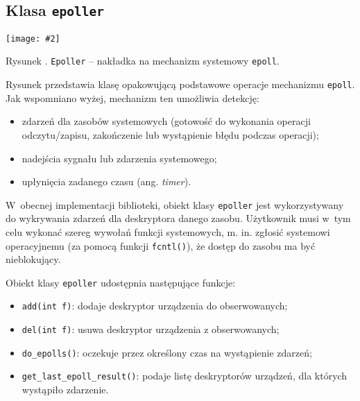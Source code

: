 \documentclass[12pt]{mwart}
\newcommand{\code}{\texttt}
\newcommand{\procbr}{()}
\newcommand{\function}[1]{\code{#1\procbr}}
\newcounter{figmain}
\newcommand{\myownfigure}[4]{ \newcounter{#1} \setcounter{#1}{\value{figmain}} \addtocounter{figmain}{1} \begin{center} \label{fig:#1} \centering \texttt{[image: \#2]}\\ \nopagebreak[5] \parbox[t]{11.5cm}{Rysunek \arabic{#1}. #3.} \end{center}}
\begin{document}
\subsection{Klasa \code{epoller}}
\myownfigure{Epoller}{Epoller.png}{\code{Epoller} -- nakładka na mechanizm systemowy \code{epoll}}{.7}
\indent
  Rysunek  przedstawia klasę opakowującą podstawowe operacje mechanizmu \code{epoll}.
  Jak wspomniano wyżej, mechanizm ten umożliwia detekcję:
  \begin{itemize}
    \item zdarzeń dla zasobów systemowych (gotowość do wykonania operacji odczytu/zapisu, zakończenie lub wystąpienie błędu podczas operacji);
    \item nadejścia sygnału lub zdarzenia systemowego;
    \item upłynięcia zadanego czasu (ang. \emph{timer}).
  \end{itemize}
  W~obecnej implementacji biblioteki, obiekt klasy \code{epoller} jest wykorzystywany do wykrywania zdarzeń dla deskryptora danego zasobu.
  Użytkownik musi w~tym celu wykonać szereg wywołań funkcji systemowych, m. in. zgłosić systemowi operacyjnemu (za pomocą funkcji \function{fcntl}),
  że dostęp do zasobu ma być nieblokujący.
\par
\indent
  Obiekt klasy \code{epoller} udostępnia następujące funkcje:
  \begin{itemize}
    \item \code{add(int f)}: dodaje deskryptor urządzenia do obserwowanych;
    \item \code{del(int f)}: usuwa deskryptor urządzenia z obserwowanych;
    \item \function{do\_epolls}: oczekuje przez określony czas na wystąpienie zdarzeń;
    \item \function{get\_last\_epoll\_result}: podaje listę deskryptorów urządzeń, dla których wystąpiło zdarzenie.
  \end{itemize}
\par
%
\newpage
\end{document}
